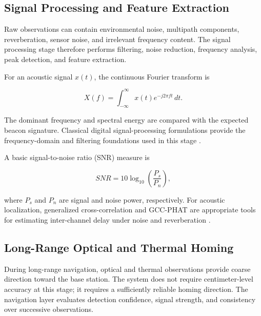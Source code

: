 \documentclass[conference]{IEEEtran}
\begin{document}

\subsection{Signal Processing and Feature Extraction}

Raw observations can contain environmental noise, multipath components,
reverberation, sensor noise, and irrelevant frequency content. The signal
processing stage therefore performs filtering, noise reduction, frequency
analysis, peak detection, and feature extraction.

For an acoustic signal $x(t)$, the continuous Fourier transform is

\begin{equation}
X(f)=\int_{-\infty}^{\infty}x(t)e^{-j2\pi ft}\,dt.
\end{equation}

The dominant frequency and spectral energy are compared with the expected
beacon signature. Classical digital signal-processing formulations provide the
frequency-domain and filtering foundations used in this stage
\cite{gonzalez2018,oppenheim1999,proakis2007,rabiner1975}.

A basic signal-to-noise ratio (SNR) measure is

\begin{equation}
SNR=10\log_{10}\left(\frac{P_s}{P_n}\right),
\end{equation}

where $P_s$ and $P_n$ are signal and noise power, respectively. For acoustic
localization, generalized cross-correlation and GCC-PHAT are appropriate tools
for estimating inter-channel delay under noise and reverberation
\cite{knapp1976,chen2006,do2010}.


\subsection{Long-Range Optical and Thermal Homing}

During long-range navigation, optical and thermal observations provide coarse
direction toward the base station. The system does not require centimeter-level
accuracy at this stage; it requires a sufficiently reliable homing direction.
The navigation layer evaluates detection confidence, signal strength, and
consistency over successive observations.
\end{document}
